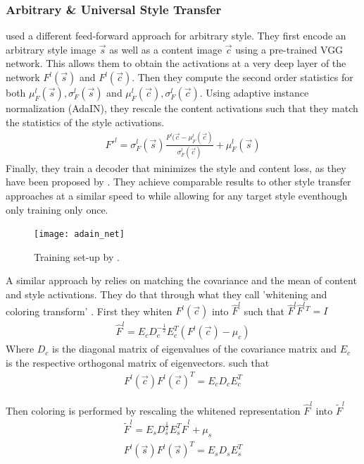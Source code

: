 \subsubsection{Arbitrary \& Universal Style Transfer}
\citeauthor*{AdaIN} used a different feed-forward approach for arbitrary style.
They first encode an arbitrary style image $\vec{s}$ as well as a content image $\vec{c}$ using a pre-trained VGG network.
This allows them to obtain the activations at a very deep layer of the network $F^l(\vec{s})$ and $F^l(\vec{c})$.
Then they compute the second order statistics for both $\mu_F^l(\vec{s}), \sigma_F^l(\vec{s})$ and $\mu_F^l(\vec{c}), \sigma_F^l(\vec{c})$.
Using adaptive instance normalization (AdaIN), they rescale the content activations such that they match the statistics of the style activations.
\begin{align}
    F'^l = \sigma_F^l(\vec{s}) \frac{F^l(\vec{c} - \mu_F^l(\vec{c})}{\sigma_F^l(\vec{c})} + \mu_F^l(\vec{s}) 
\end{align}
Finally, they train a decoder that minimizes the style and content loss, as they have been proposed by \citeauthor*{gatys}.
They achieve comparable results to other style transfer approaches at a similar speed to \citeauthor*{johnson} while allowing for any target style eventhough only training only once.
\begin{figure}
    \texttt{[image: adain\_net]}
    \caption[]{Training set-up by \citeauthor*{AdaIN}. \cite{AdaIN}}
\end{figure}

A similar approach by \citeauthor*{WCT} relies on matching the covariance and the mean of content and style activations.
They do that through what they call 'whitening and coloring transform' \cite{WCT}.
First they whiten $F^l(\vec{c})$ into $\hat{F}^l$ such that $\hat{F}^l \hat{F}^l{}^T = I$
\begin{align}
    \hat{F}^l = E_c D_c^{-\frac{1}{2}} E_c^T (F^l(\vec{c}) - \mu_c)
\end{align}
Where $D_c$ is the diagonal matrix of eigenvalues of the covariance matrix and $E_c$ is the respective orthogonal matrix of eigenvectors.
such that
\begin{align}
    F^l(\vec{c}) F^l(\vec{c})^T = E_c D_c E_c^T
\end{align}

Then coloring is performed by rescaling the whitened representation $\hat{F}^l$ into $\tilde{F}^l$
\begin{align}
    \tilde{F}^l = E_s D_s^{\frac{1}{2}} E_s^T \hat{F}^l + \mu_s \\
    F^l(\vec{s}) F^l(\vec{s})^T = E_s D_s E_s^T
\end{align}

